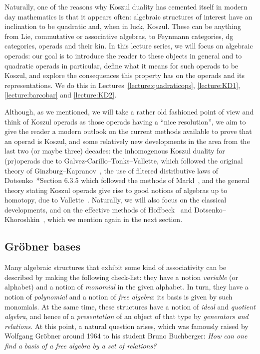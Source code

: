 \documentclass[fleqn, a4paper, twoside]{article}
\newcommand{\0}{\langle 0\rangle}
\DeclareRobustCommand{\[}{\begin{equation}}%
\DeclareRobustCommand{\]}{\end{equation}}%
\theoremstyle{mytheorem}
\theoremstyle{introthm}
\theoremstyle{mydefinition}
\theoremstyle{mydefinition2}
\theoremstyle{plain} %
\newcommand{\?}{\,?\,}
\theoremstyle{mytheorem}
\theoremstyle{plain} %
\begin{document}
Naturally, one of the reasons why Koszul duality has cemented
itself in modern day mathematics is that it appears often:
algebraic structures of interest have an inclination to be
quadratic and, when in luck, Koszul. These can be anything
from Lie, commutative or associative algebras, to Feynmann
categories, dg categories, operads and their kin. In this
lecture series, we will focus on algebraic operads: our goal
is to introduce the reader to these objects in general
and to quadratic operads in particular, define what
it means for such operads to be Koszul, and explore
the consequences this property has on the operads
and its representations. We do this in Lectures~\ref{lecture:quadraticops}, \ref{lecture:KD1}, \ref{lecture:barcobar} and \ref{lecture:KD2}.

Although, as we
mentioned, we will take a rather old fashioned point of 
view and think of Koszul operads as those operads 
having a ``nice resolution'', we aim to give the reader
a modern outlook on the current methods available to
prove that an operad is Koszul, and some relatively 
new developments in the area from the last two (or
maybe three) decades:
the inhomogenous Koszul duality for (pr)operads due
to Galvez-Carillo--Tonks--Vallette, which
followed the original theory of Ginzburg--Kapranov~\cite{Ginzburg1994},
the use of filtered distributive laws of Dotsenko~\cite{Bremner2016}*{Section 6.3.5}
which followed the methods of Markl~\cite{MarklDistributive}, and the general
theory stating Koszul operads give rise to good
notions of algebras up to homotopy, due to Vallette~\cite{Vallette2020}.
Naturally, we will also focus on the classical developments,
and on the effective methods of Hoffbeck~\cite{Hoffbeck2009} and 
Dotsenko--Khoroshkin~\cite{Dotsenko2010}, which we mention again in
the next section.

\subsection{Gr\"obner bases}
Many algebraic structures that exhibit some kind of 
associativity can be described by making the following check-list:
they have a notion \emph{variable} (or alphabet) and a notion 
of \emph{monomial} in the given alphabet. In turn, they have
a notion of \emph{polynomial} and a notion of \emph{free algebra}:
its basis is given by such monomials.
At the same time, these structures have a notion of \emph{ideal} and
\emph{quotient algebra}, and hence of a \emph{presentation} of an object of that
type by \emph{generators and relations}.
At this point, a natural question arises, which was 
famously raised by Wolfgang Gr\"obner around 1964 to his student Bruno
Buchberger: \emph{How can one find a basis of a free algebra by
a set of relations?} 
\end{document}
